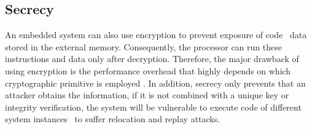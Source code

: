\subsection{Secrecy}
\label{subsec:Secrecy}

An embedded system can also use encryption to prevent exposure of code \andor~data stored in the external memory. Consequently, the processor can run these instructions and data only after decryption. Therefore, the major drawback of using encryption is the performance overhead that highly depends on which cryptographic primitive is employed \cite{Suh2007:PUFs}. In addition, secrecy only prevents that an attacker obtains the information, if it is not combined with a unique key or integrity verification, the system will be vulnerable to execute code of different system instances \andor~to suffer relocation and replay attacks\cite{Elbaz2009}.